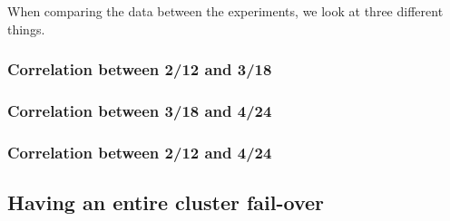 When comparing the data between the experiments, we look at three different things.

\subsubsection*{Correlation between 2/12 and 3/18}
\subsubsection*{Correlation between 3/18 and 4/24}
\subsubsection*{Correlation between 2/12 and 4/24}

\subsection{Having an entire cluster fail-over}
